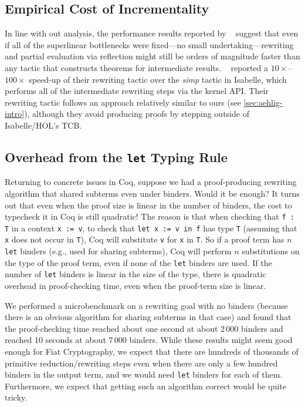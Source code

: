 \documentclass[sn-mathphys,pdflatex]{sn-jnl}%
\newcommand{\citetfield}[1]{\usebibentry{#1}{citet}~\cite{#1}}
\theoremstyle{thmstyleone}%
\theoremstyle{thmstyletwo}%
\theoremstyle{thmstylethree}%
\begin{document}
\subsection{Empirical Cost of Incrementality}

In line with out analysis, the performance results reported by \citetfield{Aehlig} suggest that even if all of the superlinear bottlenecks were fixed---no small undertaking---rewriting and partial evaluation via reflection might still be orders of magnitude faster than any tactic that constructs theorems for intermediate results.
\citetfield{Aehlig} reported a $10\times$--$100\times$ speed-up of their rewriting tactic over the \emph{simp} tactic in Isabelle, which performs all of the intermediate rewriting steps via the kernel API.
Their rewriting tactic follows an approach relatively similar to ours (see \autoref{sec:aehlig-intro}), although they avoid producing proofs by stepping outside of Isabelle/HOL's TCB.

\subsection{Overhead from the \texorpdfstring{\texttt{let}}{let} Typing Rule}

Returning to concrete issues in Coq, suppose we had a proof-producing rewriting algorithm that shared subterms even under binders.
Would it be enough?
It turns out that even when the proof size is linear in the number of binders, the cost to typecheck it in Coq is still quadratic!
The reason is that when checking that \texttt{f : T} in a context \texttt{x := v}, to check that \texttt{let x := v in f} has type \texttt{T} (assuming that \texttt{x} does not occur in \texttt{T}), Coq will substitute \texttt{v} for \texttt{x} in \texttt{T}.
So if a proof term has $n$ \texttt{let} binders (e.g., used for sharing subterms), Coq will perform $n$ substitutions on the type of the proof term, even if none of the \texttt{let} binders are used.
If the number of \texttt{let} binders is linear in the size of the type, there is quadratic overhead in proof-checking time, even when the proof-term size is linear.

We performed a microbenchmark on a rewriting goal with no binders (because there is an obvious algorithm for sharing subterms in that case) and found that the proof-checking time reached about one second at about 2\,000 binders and reached 10 seconds at about 7\,000 binders.
While these results might seem good enough for Fiat Cryptography, we expect that there are hundreds of thousands of primitive reduction/rewriting steps even when there are only a few hundred binders in the output term, and we would need \texttt{let} binders for each of them.
Furthermore, we expect that getting such an algorithm correct would be quite tricky.
\end{document}
